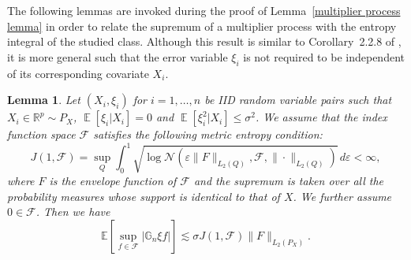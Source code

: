 \documentclass[12pt]{article}
\DeclareMathOperator*{\E}{\mathbb{E}}
\newtheorem{lemma}[theorem]{Lemma}
\begin{document}
\begin{appendices}
The following lemmas are invoked during the proof of Lemma~\ref{multiplier process lemma} in order to relate the supremum of a multiplier process with the entropy integral of the studied class. Although this result is similar to Corollary~2.2.8 of \cite{van1996weak}, it is more general such that the error variable $\xi_i$ is not required to be independent of its corresponding covariate $X_i$.
\begin{lemma}
\label{heavy tail multiplier process lemma}
Let $(X_i,\xi_i)$ for $i=1, \dots ,n$ be IID random variable pairs such that $X_i\in \mathbb{R}^p\sim P_X$, $\E[\xi_i | X_i]=0$ and $\E[\xi_i^2 | X_i]\leq \sigma^2$. We assume that the index function space $\mathcal{F}$ satisfies the following metric entropy condition:
\begin{equation}
   J(1,\mathcal{F}) = \sup_{Q} \int_0^1 \sqrt{\log \mathcal{N}(\varepsilon\|F\|_{L_2(Q)},\mathcal{F}, \|\cdot\|_{L_2(Q)})} \, d\varepsilon< \infty,\nonumber
\end{equation}
where $F$ is the envelope function of $\mathcal{F}$ and the supremum is taken over all the probability measures whose support is identical to that of $X$. We further assume $0\in\mathcal{F}$. Then we have
\begin{equation}
    \mathbb{E}\left[\sup_{f\in\mathcal{F}} \left|\mathbb{G}_n \xi f\right|\right] \lesssim \sigma J(1,\mathcal{F})\|F\|_{L_2(P_X)}.\nonumber
\end{equation}
\end{lemma}


\end{appendices}
\end{document}
